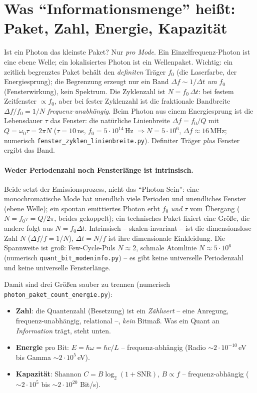 \section{Was \enquote{Informationsmenge} heißt: Paket, Zahl, Energie, Kapazität}
Ist ein Photon das kleinste Paket? Nur \emph{pro Mode}. Ein Einzelfrequenz-Photon ist eine ebene Welle;
ein lokalisiertes Photon ist ein Wellenpaket. Wichtig: ein zeitlich begrenztes Paket
behält den \emph{definiten} Träger $f_0$ (die Laserfarbe, der Energiesprung); die Begrenzung erzeugt nur
ein Band $\Delta f\sim1/\Delta t$ \emph{um} $f_0$ (Fensterwirkung), kein Spektrum. Die Zyklenzahl ist
$N=f_0\,\Delta t$: bei festem Zeitfenster $\propto f_0$, aber bei fester Zyklenzahl ist die fraktionale
Bandbreite $\Delta f/f_0=1/N$ \emph{frequenz-unabhängig}. Beim Photon aus einem Energiesprung ist die
Lebensdauer $\tau$ das Fenster: die natürliche Linienbreite $\Delta f=f_0/Q$ mit $Q=\omega_0\tau=2\pi N$
($\tau=10$\,ns, $f_0=5\cdot10^{14}$\,Hz $\Rightarrow N=5\cdot10^6$, $\Delta f\approx16$\,MHz; numerisch
\texttt{fenster\_zyklen\_linienbreite.py}). Definiter Träger \emph{plus} Fenster ergibt das Band.

\paragraph{Weder Periodenzahl noch Fensterlänge ist intrinsisch.} Beide setzt der Emissionsprozess, nicht
das \enquote{Photon-Sein}: eine monochromatische Mode hat unendlich viele Perioden und unendliches Fenster
(ebene Welle); ein spontan emittiertes Photon erbt $f_0$ \emph{und} $\tau$ vom Übergang
($N=f_0\tau=Q/2\pi$, beides gekoppelt); ein technisches Paket fixiert eine Größe, die andere folgt aus
$N=f_0\Delta t$. Intrinsisch -- skalen-invariant -- ist die dimensionslose Zahl $N$ ($\Delta f/f=1/N$),
$\Delta t=N/f$ ist ihre dimensionale Einkleidung. Die Spannweite ist groß: Few-Cycle-Puls $N\approx2$,
schmale Atomlinie $N\approx5\cdot10^6$ (numerisch \texttt{quant\_bit\_modeninfo.py}) -- es gibt keine
universelle Periodenzahl und keine universelle Fensterlänge.

Damit sind drei Größen sauber zu trennen (numerisch \texttt{photon\_paket\_count\_energie.py}):

\begin{itemize}
  \item \textbf{Zahl}: die Quantenzahl (Besetzung) ist ein \emph{Zählwert} -- eine Anregung,
        frequenz-unabhängig, relational --, \emph{kein} Bitmaß. Was ein Quant an \emph{Information} trägt,
        steht unten.
  \item \textbf{Energie} pro Bit: $E=\hbar\omega=\hbar c/L$ -- frequenz-abhängig (Radio
        $\sim2\cdot10^{-10}$\,eV bis Gamma $\sim2\cdot10^{5}$\,eV).
  \item \textbf{Kapazität}: Shannon $C=B\log_2(1+\mathrm{SNR})$, $B\propto f$ -- frequenz-abhängig
        ($\sim2\cdot10^{5}$ bis $\sim2\cdot10^{20}$ Bit/s).
\end{itemize}

